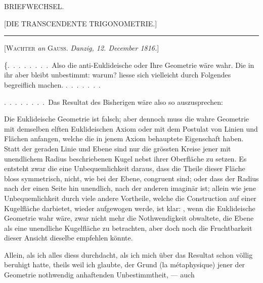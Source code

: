 \clearpage
\begin{center}
{\Large BRIEFWECHSEL.}
\end{center}

\bigskip
\begin{center}
[DIE TRANSCENDENTE TRIGONOMETRIE.]
\end{center}

\begin{center}\rule{2cm}{0.4pt}\end{center}

\begin{center}
[\textsc{Wachter} \emph{an} \textsc{Gauss}. \emph{Danzig, 12. December 1816.}]
\end{center}

\{.\ .\ .\ .\ .\ .\ .\ .\ Also die anti-Euklideische oder Ihre Geometrie wäre wahr.
Die  in ihr aber bleibt unbestimmt: warum? liesse sich vielleicht durch
Folgendes begreiflich machen. .\ .\ .\ .\ .\ .\ .

.\ .\ .\ .\ .\ .\ .\ .\ Das Resultat des Bisherigen wäre also so auszusprechen:

Die
Euklideische Geometrie ist falsch; aber dennoch muss die wahre Geometrie mit
demselben elften Euklideischen Axiom oder mit dem Postulat von Linien und Flächen
anfangen, welche die in jenem Axiom behauptete Eigenschaft haben. Statt der
geraden Linie und Ebene sind nur die grössten Kreise jener mit unendlichem Radius
beschriebenen Kugel nebst ihrer Oberfläche zu setzen. Es entsteht zwar die eine
Unbequemlichkeit daraus, dass die Theile dieser Fläche bloss symmetrisch, nicht,
wie bei der Ebene, congruent sind; oder dass der Radius nach der einen Seite hin
unendlich, nach der anderen imaginär ist; allein wie jene Unbequemlichkeit durch
viele andere Vortheile, welche die Construction auf einer Kugelfläche darbietet,
wieder aufgewogen werde, ist klar: , wenn die
Euklideische Geometrie wahr wäre, zwar nicht mehr die Nothwendigkeit obwaltete,
die Ebene als eine unendliche Kugelfläche zu betrachten, aber doch noch die
Fruchtbarkeit dieser Ansicht dieselbe empfehlen könnte.

Allein, als ich alles diess durchdacht, als ich mich über das Resultat schon
völlig beruhigt hatte, theils weil ich glaubte, der Grund (la métaphysique) jener
der Geometrie nothwendig anhaftenden Unbestimmtheit, --- auch
